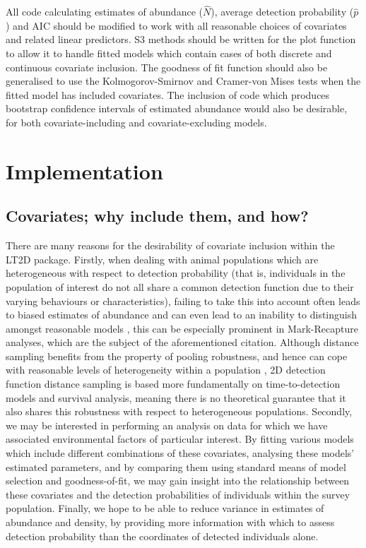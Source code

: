 \documentclass[11pt]{article}
\begin{document}
\begin{multicols}{2}
All code calculating estimates of abundance ($\hat{N}$), average detection probability ($\hat{p}$) and AIC should be modified to work with all reasonable choices of covariates and related linear predictors. S3 methods should be written for the plot function to allow it to handle fitted models which contain cases of both discrete and continuous covariate inclusion. The goodness of fit function should also be generalised to use the Kolmogorov-Smirnov and Cramer-von Mises tests when the fitted model has included covariates. The inclusion of code which produces bootstrap confidence intervals of estimated abundance would also be desirable, for both covariate-including and covariate-excluding models.

\section{Implementation}
\subsection{Covariates; why include them, and how?}
There are many reasons for the desirability of covariate inclusion within the LT2D package. Firstly, when dealing with animal populations which are heterogeneous with respect to detection probability (that is, individuals in the population of interest do not all share a common detection function due to their varying behaviours or characteristics), failing to take this into account often leads to biased estimates of abundance and can even lead to an inability to distinguish amongst reasonable models \cite{Link}, this can be especially prominent in Mark-Recapture analyses, which are the subject of the aforementioned citation. Although distance sampling benefits from the property of pooling robustness, and hence can cope with reasonable levels of heterogeneity within a population \cite{Buckland2004}, 2D detection function distance sampling is based more fundamentally on time-to-detection models and survival analysis, meaning there is no theoretical guarantee that it also shares this robustness with respect to heterogeneous populations. Secondly, we may be interested in performing an analysis on data for which we have associated environmental factors of particular interest. By fitting various models which include different combinations of these covariates, analysing these models' estimated parameters, and by comparing them using standard means of model selection and goodness-of-fit, we may gain insight into the relationship between these covariates and the detection probabilities of individuals within the survey population. Finally, we hope to be able to reduce variance in estimates of abundance and density, by providing more information with which to assess detection probability than the coordinates of detected individuals alone.


\end{multicols}
\end{document}
